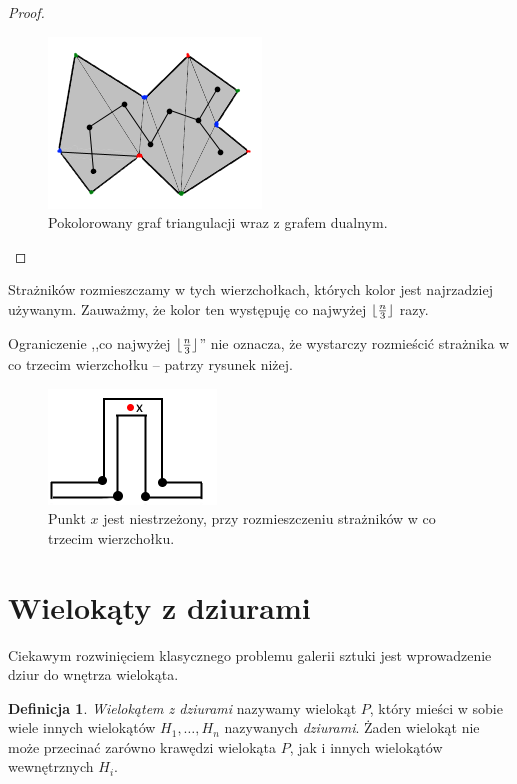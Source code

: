 \documentclass[brudnopis]{xmgr}
\DeclarePairedDelimiter\floor{\lfloor}{\rfloor}
\theoremstyle{definition}
\newtheorem{Definicja}{Definicja}
\begin{document}
\begin{proof}
\begin{figure}[ht!]
      \includegraphics{rysunki/dual_caly_kolor.png}
      \caption{Pokolorowany graf triangulacji wraz z grafem dualnym.}
      \label{fig:graf_triangulacji}
  \end{figure} 
\end{proof}
	Strażników rozmieszczamy w tych wierzchołkach, których kolor jest najrzadziej używanym. Zauważmy, że kolor ten występuję co najwyżej $\floor{\frac{n}{3}}$ razy. 

\indent Ograniczenie ,,co najwyżej $\floor{\frac{n}{3}}$'' nie oznacza, że wystarczy rozmieścić strażnika w co trzecim wierzchołku -- patrzy rysunek niżej.
\begin{figure}[ht!]
  \centering
  \includegraphics{rysunki/co_trzeci.png}
  \caption{Punkt $x$ jest niestrzeżony, przy rozmieszczeniu strażników w co trzecim wierzchołku.}
\end{figure} 

\section{Wielokąty z dziurami}
Ciekawym rozwinięciem klasycznego problemu galerii sztuki jest wprowadzenie dziur do wnętrza wielokąta.

\begin{Definicja} \label{def wielokat z dziurami}
  \emph{Wielokątem z dziurami} nazywamy wielokąt $P$, który mieści w sobie wiele innych wielokątów $H_1, \ldots, H_n$ nazywanych \emph{dziurami}. Żaden wielokąt nie może przecinać zarówno krawędzi wielokąta $P$, jak i innych wielokątów wewnętrznych $H_i$.
\end{Definicja}
\end{document}
